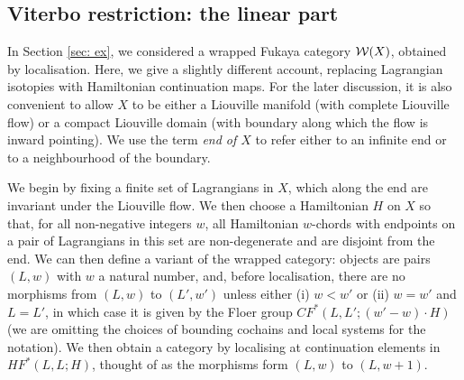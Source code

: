 \documentclass{article}
\theoremstyle{plain}%
\theoremstyle{definition}
\numberwithin{equation}{section}
\numberwithin{figure}{section}
\def\cF{{\mathbin{\cal F}}}
\def\cW{{\mathbin{\cal W}}}
\def\iy{\infty}
\def\ex{{   {\rm ex}    }}\def\virt{{   {\rm virt}    }}\def\ev{{\rm ev}}\def\sing{{\rm sing}}\def\cont{{\rm cont}}
\begin{document}




\subsection{Viterbo restriction: the linear part}
\label{sec:viterbo-restriction-1}

In Section \ref{sec: ex}, we considered a wrapped Fukaya category $\cW(X)$, obtained by localisation. Here, we give a slightly different account, replacing Lagrangian isotopies with Hamiltonian continuation maps. For the later discussion, it is also convenient to allow $X$ to be either a Liouville manifold (with complete Liouville flow) or a compact Liouville domain (with boundary along which the flow is inward pointing). We use the term \emph{end of $X$} to refer either to an infinite end or to a neighbourhood of the boundary.

We begin by fixing a finite set of Lagrangians in $X$, which along the end are invariant under the Liouville flow. We then choose a Hamiltonian $H$ on $X$ so that, for all non-negative integers $w$, all Hamiltonian $w$-chords with endpoints on a pair of Lagrangians in this set are non-degenerate and are disjoint from the end. We can then define a variant of the wrapped category:  objects are pairs $(L,w)$ with $w$ a natural number, and, before localisation, there are no morphisms from $(L,w)$ to $(L',w')$ unless either (i)  $w < w'$ or (ii) $w=w'$ and $L=L'$, in which case it is given by the Floer group $CF^*(L,L'; (w'-w) \cdot H)$ (we are omitting the choices of bounding cochains and local systems for the notation). We then obtain a category by localising at continuation elements in $HF^*(L,L; H) $, thought of as the morphisms form $(L,w)$ to $(L,w+1)$.
\end{document}
